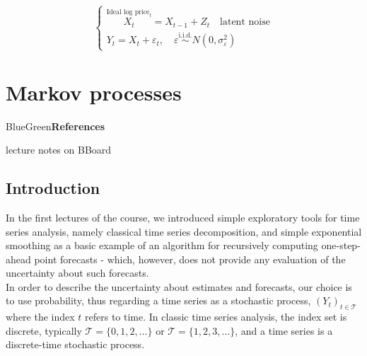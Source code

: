 \documentclass[dvipsnames,12pt]{book}
\begin{document}
            \begin{example}

                \begin{equation}
                    \begin{cases}
                        \overset{\text{Ideal log price}_{t}}{X_t}= X_{t-1} + Z_t \quad \text{latent noise} \\
                        Y_t = X_t + \varepsilon_t, \quad \varepsilon \overset{\text{i.i.d.}}{\sim} N(0,\sigma^2_{\varepsilon})
                    \end{cases}
                \end{equation}
                
            \end{example}
            

    \chapter{Markov processes}

            \begin{mybox}{BlueGreen}{\textbf{References}}

                lecture notes on BBoard
                
            \end{mybox}

        \section{Introduction}

            In the first lectures of the course, we introduced simple exploratory tools for time series analysis, namely classical time series decomposition, and simple exponential smoothing as a basic example of an algorithm for recursively computing one-step-ahead point forecasts - which, however, does not provide any evaluation of the uncertainty about such forecasts. \\

            In order to describe the uncertainty about estimates and forecasts, our choice is to use probability, thus regarding a time series as a stochastic process, \((Y_t)_{t \in \mathcal{T}}\) where the index \(t\) refers to time. In classic time series analysis, the index set is discrete, typically \(\mathcal{T}= \{ 0,1,2, \ldots \}\) or \(\mathcal{T}= \{ 1,2,3, \ldots \}\), and a time series is a discrete-time stochastic process. \\
\end{document}
